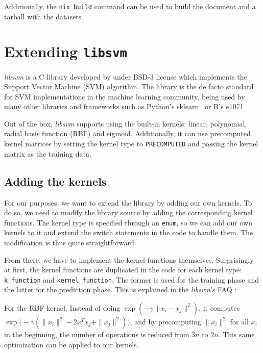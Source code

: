 Additionally, the \texttt{nix build} command can be used to build the document
and a tarball with the datasets.

\section{Extending \texttt{libsvm}}%
\label{sub:impl_c}

\emph{libsvm} is a C library developed by \textcite{CC01a} under BSD-3 license which implements the
Support Vector Machine (SVM) algorithm. The library is the de facto standard for SVM implementations in
the machine learning community, being used by many other libraries and frameworks such as
Python's sklearn~\cite{ScikitlearnScikitlearn2023} or R's e1071~\cite{meyer[autE1071MiscFunctions2023}.

Out of the box, \emph{libsvm} supports using the built-in kernels: linear, polynomial,
radial basis function (RBF) and sigmoid. Additionally, it can use precomputed kernel matrices
by setting the kernel type to \texttt{PRECOMPUTED} and passing the kernel matrix as the
training data.

\subsection{Adding the kernels}

For our purposes, we want to extend the library by adding our own kernels. To do so, we
need to modify the library source by adding the corresponding kernel functions. The kernel
type is specified through an \texttt{enum}, so we can add our own kernels to it and extend the
switch statements in the code to handle them. The modification is thus quite straightforward.
\cite{arquemartinezDissenyImplementacioEstudi2021}

From there, we have to implement the kernel functions themselves. Surprisingly at first,
the kernel functions are duplicated in the code for each kernel type:
\texttt{k\_function} and \texttt{kernel\_function}. The former is used for the training
phase and the latter for the prediction phase. This is explained in the \emph{libsvm}'s
FAQ \cite{LIBSVMFAQ}:

For the RBF kernel, Instead of doing $\exp\left(-\gamma\|x_i - x_j\|^2\right)$, it computes
$\exp\bigl(-\gamma(\|x_i\|^2 - 2x_i^Tx_j + \|x_j\|^2)\bigr)$, and by precomputing
$\|x_i\|^2$ for all $x_i$ in the beginning, the number of operations is reduced from
$3n$ to $2n$. This same optimization can be applied to our kernels.

